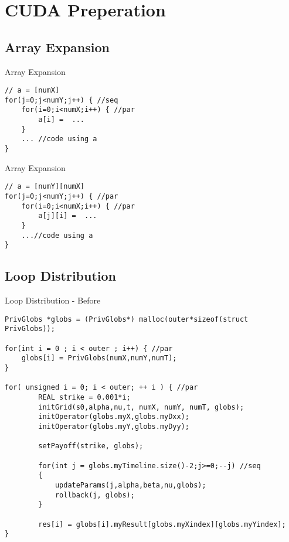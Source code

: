 \documentclass[xcolor=x11names,compress]{beamer}
\begin{document}
\section{CUDA Preperation}
\subsection{Array Expansion}
\begin{frame}[fragile]{Array Expansion}
        \begin{verbatim}
// a = [numX]
for(j=0;j<numY;j++) { //seq
    for(i=0;i<numX;i++) { //par
        a[i] =  ...
    }
    ... //code using a
}
\end{verbatim}
\end{frame}

\begin{frame}[fragile]{Array Expansion}
\begin{verbatim}
// a = [numY][numX]
for(j=0;j<numY;j++) { //par
    for(i=0;i<numX;i++) { //par
        a[j][i] =  ...
    }
    ...//code using a
}
\end{verbatim}
\end{frame}

\subsection{Loop Distribution}
\begin{frame}[fragile]{Loop Distribution - Before}
\begin{verbatim}
PrivGlobs *globs = (PrivGlobs*) malloc(outer*sizeof(struct PrivGlobs));

for(int i = 0 ; i < outer ; i++) { //par
    globs[i] = PrivGlobs(numX,numY,numT);
}

for( unsigned i = 0; i < outer; ++ i ) { //par
        REAL strike = 0.001*i;
        initGrid(s0,alpha,nu,t, numX, numY, numT, globs);
        initOperator(globs.myX,globs.myDxx);
        initOperator(globs.myY,globs.myDyy);

        setPayoff(strike, globs);

        for(int j = globs.myTimeline.size()-2;j>=0;--j) //seq
        {
            updateParams(j,alpha,beta,nu,globs);
            rollback(j, globs);
        }

        res[i] = globs[i].myResult[globs.myXindex][globs.myYindex];
}
\end{verbatim}
\end{frame}
\end{document}
